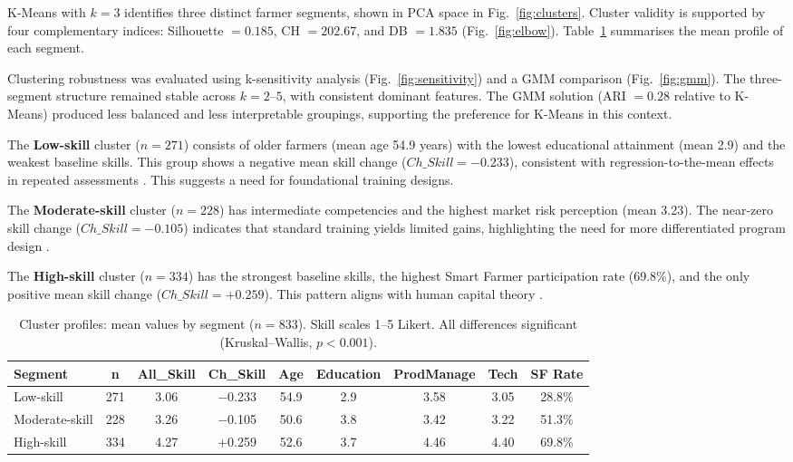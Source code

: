 \documentclass[3p,twocolumn,authoryear]{elsarticle}
\begin{document}
K-Means with $k = 3$ identifies three distinct farmer segments, shown in PCA
space in Fig.~\ref{fig:clusters}. Cluster validity is supported by four
complementary indices: Silhouette $= 0.185$, CH $= 202.67$, and DB $= 1.835$
(Fig.~\ref{fig:elbow}). Table~\ref{tab:cluster_profile} summarises the mean
profile of each segment.

Clustering robustness was evaluated using k-sensitivity analysis
(Fig.~\ref{fig:sensitivity}) and a GMM comparison (Fig.~\ref{fig:gmm}). The
three-segment structure remained stable across $k = 2$--$5$, with consistent
dominant features. The GMM solution (ARI $= 0.28$ relative to K-Means) produced
less balanced and less interpretable groupings, supporting the preference for
K-Means in this context.

The \textbf{Low-skill} cluster ($n = 271$) consists of older farmers (mean age
54.9 years) with the lowest educational attainment (mean 2.9) and the weakest
baseline skills. This group shows a negative mean skill change
($Ch\_Skill = -0.233$), consistent with regression-to-the-mean effects in
repeated assessments \citep{davis2012}. This suggests a need for foundational
training designs.

The \textbf{Moderate-skill} cluster ($n = 228$) has intermediate competencies
and the highest market risk perception (mean 3.23). The near-zero skill change
($Ch\_Skill = -0.105$) indicates that standard training yields limited gains,
highlighting the need for more differentiated program design
\citep{anderson2004}.

The \textbf{High-skill} cluster ($n = 334$) has the strongest baseline skills,
the highest Smart Farmer participation rate (69.8\%), and the only positive mean
skill change ($Ch\_Skill = +0.259$). This pattern aligns with human capital
theory \citep{feder1985,davis2012}.

\begin{table}[htbp]
\centering
\caption{Cluster profiles: mean values by segment ($n = 833$). Skill scales 1--5 Likert. All differences significant (Kruskal--Wallis,
$p < 0.001$).}
\label{tab:cluster_profile}
\begin{tabular}{@{}lcccccccc@{}}
\toprule
\textbf{Segment} & \textbf{n} & \textbf{All\_Skill}
& \textbf{Ch\_Skill} & \textbf{Age}
& \textbf{Education} & \textbf{ProdManage}
& \textbf{Tech} & \textbf{SF Rate} \\
\midrule
Low-skill      & 271 & 3.06 & $-$0.233 & 54.9 & 2.9 & 3.58 & 3.05 & 28.8\% \\
Moderate-skill & 228 & 3.26 & $-$0.105 & 50.6 & 3.8 & 3.42 & 3.22 & 51.3\% \\
High-skill     & 334 & 4.27 & $+$0.259 & 52.6 & 3.7 & 4.46 & 4.40 & 69.8\% \\
\bottomrule
\end{tabular}
\end{table}
\end{document}
